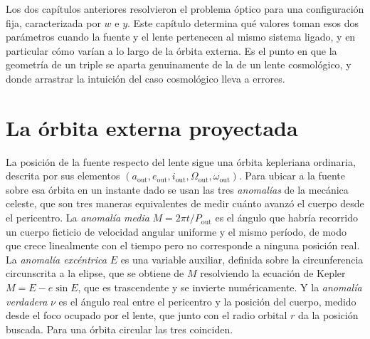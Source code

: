 \documentclass[11pt,a4paper,openany]{book}
\newcommand{\aout}{a_{\mathrm{out}}}
\begin{document}
Los dos cap\'itulos anteriores resolvieron el problema \'optico para una
configuraci\'on fija, caracterizada por $w$ e $y$. Este cap\'itulo determina
qu\'e valores toman esos dos par\'ametros cuando la fuente y el lente
pertenecen al mismo sistema ligado, y en particular c\'omo var\'ian a lo largo
de la \'orbita externa. Es el punto en que la geometr\'ia de un triple se
aparta genuinamente de la de un lente cosmol\'ogico, y donde arrastrar la
intuici\'on del caso cosmol\'ogico lleva a errores.

\section{La \'orbita externa proyectada}
\label{sec:orbita}

La posici\'on de la fuente respecto del lente sigue una \'orbita kepleriana
ordinaria, descrita por sus elementos
$(\aout,e_\mathrm{out},i_\mathrm{out},\Omega_\mathrm{out},\omega_\mathrm{out})$.
Para ubicar a la fuente sobre esa \'orbita en un instante dado se usan las
tres \emph{anomal\'ias} de la mec\'anica celeste, que son tres maneras
equivalentes de medir cu\'anto avanz\'o el cuerpo desde el pericentro. La
\emph{anomal\'ia media} $M=2\pi t/P_\mathrm{out}$ es el \'angulo que
habr\'ia recorrido un cuerpo ficticio de velocidad angular uniforme y el mismo
per\'iodo, de modo que crece linealmente con el tiempo pero no corresponde a
ninguna posici\'on real. La \emph{anomal\'ia exc\'entrica} $E$ es una
variable auxiliar, definida sobre la circunferencia circunscrita a la elipse,
que se obtiene de $M$ resolviendo la ecuaci\'on de Kepler $M=E-e\sin E$, que
es trascendente y se invierte num\'ericamente. Y la \emph{anomal\'ia
verdadera} $\nu$ es el \'angulo real entre el pericentro y la posici\'on del
cuerpo, medido desde el foco ocupado por el lente, que junto con el radio
orbital $r$ da la posici\'on buscada. Para una \'orbita circular las tres
coinciden.
\end{document}
